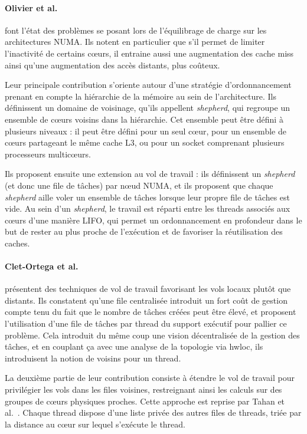 \paragraph{Olivier et al.~\cite{Olivier2012, Olivier2013}} font l'état des problèmes se posant lors de l'équilibrage de charge sur les architectures NUMA.
Ils notent en particulier que s'il permet de limiter l'inactivité de certains cœurs, il entraine aussi une augmentation des cache miss ainsi qu'une augmentation des accès distants, plus coûteux.

Leur principale contribution s'oriente autour d'une stratégie d'ordonnancement prenant en compte la hiérarchie de la mémoire au sein de l'architecture.
Ils définissent un domaine de voisinage, qu'ils appellent \emph{shepherd}, qui regroupe un ensemble de cœurs voisins dans la hiérarchie.
Cet ensemble peut être défini à plusieurs niveaux : il peut être défini pour un seul cœur, pour un ensemble de cœurs partageant le même cache L3, ou pour un socket comprenant plusieurs processeurs multicœurs.

Ils proposent ensuite une extension au vol de travail : ils définissent un \emph{shepherd} (et donc une file de tâches) par nœud NUMA, et ils proposent que chaque \emph{shepherd} aille voler un ensemble de tâches lorsque leur propre file de tâches est vide.
Au sein d'un \emph{shepherd}, le travail est réparti entre les threads associés aux cœurs d'une manière LIFO, qui permet un ordonnancement en profondeur dans le but de rester au plus proche de l'exécution et de favoriser la réutilisation des caches.


\paragraph{Clet-Ortega et al.~\cite{Clet2014}} présentent des techniques de vol de travail favorisant les vols locaux plutôt que distants.
Ils constatent qu'une file centralisée introduit un fort coût de gestion compte tenu du fait que le nombre de tâches créées peut être élevé, et proposent l'utilisation d'une file de tâches par thread du support exécutif pour pallier ce problème.
Cela introduit du même coup une vision décentralisée de la gestion des tâches, et en couplant ça avec une analyse de la topologie via hwloc, ils introduisent la notion de voisins pour un thread.

La deuxième partie de leur contribution consiste à étendre le vol de travail pour privilégier les vols dans les files voisines, restreignant ainsi les calculs sur des groupes de cœurs physiques proches.
Cette approche est reprise par Tahan et al.~\cite{Tahan2014}. Chaque thread dispose d'une liste privée des autres files de threads, triée par la distance au cœur sur lequel s'exécute le thread.



